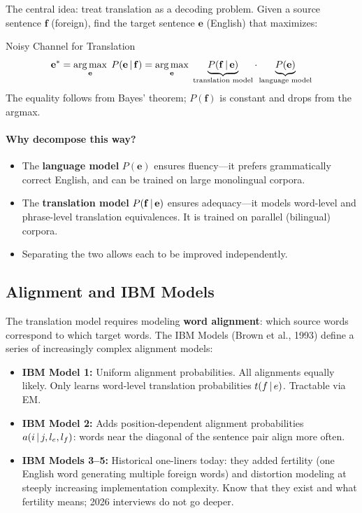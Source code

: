 The central idea: treat translation as a decoding problem.  Given a source
sentence $\mathbf{f}$ (foreign), find the target sentence $\mathbf{e}$
(English) that maximizes:

\begin{mathresult}{Noisy Channel for Translation}
\begin{equation}
\mathbf{e}^* = \operatorname*{arg\,max}_{\mathbf{e}}\; P(\mathbf{e} \,|\, \mathbf{f})
= \operatorname*{arg\,max}_{\mathbf{e}}\; \underbrace{P(\mathbf{f} \,|\, \mathbf{e})}_{\text{translation model}} \cdot \underbrace{P(\mathbf{e})}_{\text{language model}}
\label{eq:noisy_channel}
\end{equation}
The equality follows from Bayes' theorem; $P(\mathbf{f})$ is constant and
drops from the argmax.
\end{mathresult}

\paragraph{Why decompose this way?}
\begin{itemize}
    \item The \textbf{language model} $P(\mathbf{e})$ ensures fluency---it
    prefers grammatically correct English, and can be trained on large
    monolingual corpora.
    \item The \textbf{translation model} $P(\mathbf{f} \,|\, \mathbf{e})$
    ensures adequacy---it models word-level and phrase-level translation
    equivalences.  It is trained on parallel (bilingual) corpora.
    \item Separating the two allows each to be improved independently.
\end{itemize}

\subsection{Alignment and IBM Models}

The translation model requires modeling \textbf{word alignment}: which source
words correspond to which target words.  The IBM Models (Brown et al., 1993)
define a series of increasingly complex alignment models:

\begin{itemize}
    \item \textbf{IBM Model 1:} Uniform alignment probabilities.  All alignments
    equally likely.  Only learns word-level translation probabilities $t(f \,|\, e)$.
    Tractable via EM.
    \item \textbf{IBM Model 2:} Adds position-dependent alignment probabilities
    $a(i \,|\, j, l_e, l_f)$: words near the diagonal of the sentence pair
    align more often.
    \item \textbf{IBM Models 3--5:} Historical one-liners today: they added
    fertility (one English word generating multiple foreign words) and
    distortion modeling at steeply increasing implementation complexity.  Know
    that they exist and what fertility means; 2026 interviews do not go deeper.
\end{itemize}

